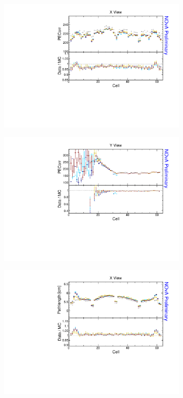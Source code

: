 \begin{figure}[!ht]
\begin{subfigure}{0.5\textwidth}
  \end{subfigure}
  \begin{subfigure}{0.5\textwidth}
    \includegraphics[width=\linewidth]{essentialsec_tb/pecorr_cell_x.pdf}
  \end{subfigure}
  \begin{subfigure}{0.5\textwidth}
    \includegraphics[width=\linewidth]{essentialsec_tb/pecorr_cell_y.pdf}
  \end{subfigure}
  \begin{subfigure}{0.5\textwidth}
    \includegraphics[width=\linewidth]{essentialsec_tb/cm_cell_x.pdf}

\end{subfigure}
\end{figure}
